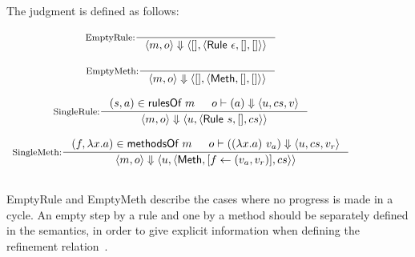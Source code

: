 \begin{definition}
  \label{def-semsstep}
  The judgment  is defined as follows:
  \begin{center}
    \begin{math}
      \begin{array}{c}
        \inference[EmptyRule:]{}
                  {\semsstep{m}{o}{\emptymap}
                    {\alpharule{\epsilon}}{\emptymap}{\emptymap}} \\
        \mbox{} \\
        \inference[EmptyMeth:]{}
                  {\semsstep{m}{o}{\emptymap}
                    {\alphameth}{\emptymap}{\emptymap}} \\
        \mbox{} \\
        \inference[SingleRule:]{\rulepair{s}{a} \in \rulesofm{m} & \semact{o}{a}{u}{cs}{v}}
                  {\semsstep{m}{o}{u}{\alpharule{s}}{\emptymap}{cs}} \\
        \mbox{} \\
        \inference[SingleMeth:]{\methodpair{f}{\lambda x.a} \in \methsofm{m} &
          \semact{o}{(\lambda x.a)\ v_a}{u}{cs}{v_r}}
                  {\semsstep{m}{o}{u}{\alphameth{}}{\lblupd{}{f}{(v_a, v_r)}}{cs}} \\
        \mbox{} \\
      \end{array}
    \end{math}
  \end{center}
\end{definition}

EmptyRule and EmptyMeth describe the cases where no progress is made
in a cycle. An empty step by a rule and one by a method should be
separately defined in the \Substep{} semantics, in order to give
explicit information when defining the refinement
relation~\cite{murali-thesis}.

